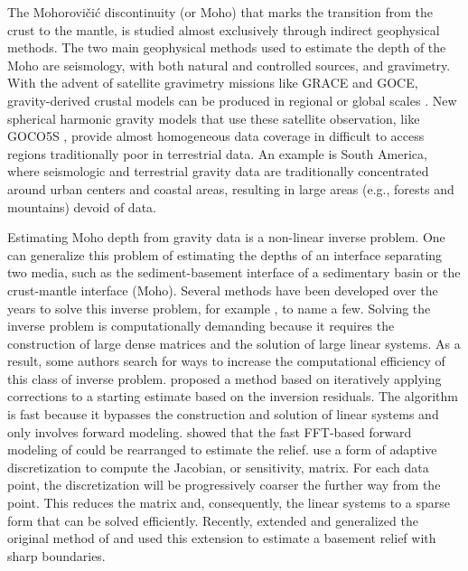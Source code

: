 \documentclass[extra,mreferee]{gji}
\begin{document}
The Mohorovičić discontinuity (or Moho) that marks the transition from the
crust to the mantle, is studied almost exclusively through indirect geophysical
methods.
The two main geophysical methods used to estimate the depth of the Moho are
seismology, with both natural and controlled sources, and gravimetry.
With the advent of satellite gravimetry missions like GRACE and GOCE,
gravity-derived crustal models can be produced in regional or global scales
\citep[e.g. ][]{reguzzoni2013,vandermeijde2013,vandermeijde2015}.
New spherical harmonic gravity models that use these satellite observation,
like GOCO5S \citep{mayer-guerr2015}, provide almost homogeneous data coverage
in difficult to access regions traditionally poor in terrestrial data.
An example is South America, where seismologic and terrestrial gravity data
are traditionally concentrated around urban centers and coastal areas,
resulting in large areas (e.g., forests and mountains) devoid of data.

Estimating Moho depth from gravity data is a non-linear inverse problem.
One can generalize this problem of estimating the depths of an interface
separating two media,
such as the sediment-basement interface of a sedimentary basin or the
crust-mantle interface (Moho).
Several methods have been developed over the years to solve this inverse
problem, for example
\citet{bott1960, barbosa1999b, barbosa1999a, barnes2012, leao1996, martins2010,
martins2011, oldenburg1974, reguzzoni2013, santos2015, silva2006, silva2014},
to name a few.
Solving the inverse problem is computationally demanding because it requires
the construction of large dense matrices and the solution of large linear
systems.
As a result, some authors search for ways to increase the computational
efficiency of this class of inverse problem.
\citet{bott1960} proposed a method based on iteratively applying corrections to
a starting estimate based on the inversion residuals.
The algorithm is fast because it bypasses the construction and solution of
linear systems and only involves forward modeling.
\citet{oldenburg1974} showed that the fast FFT-based forward modeling of
\citet{parker1973} could be rearranged to estimate the relief.
\citet{barnes2012} use a form of adaptive discretization to compute the
Jacobian, or sensitivity, matrix.
For each data point, the discretization will be progressively coarser
the further way from the point.
This reduces the matrix and, consequently, the linear systems to a sparse form
that can be solved efficiently.
Recently, \citet{silva2014} extended and generalized the original method of
\citet{bott1960} and \citet{santos2015} used this extension to estimate a
basement relief with sharp boundaries.
\end{document}
